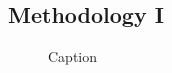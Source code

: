 \documentclass[10pt]{article}
\begin{document}
\subsection{Methodology I}

\begin{figure}[H]
    \centering
    
    \caption{Caption}
    \label{fig:enter-label}
\end{figure}
\end{document}

